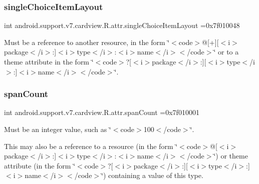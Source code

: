 \subsubsection{\texorpdfstring{single\+Choice\+Item\+Layout}{singleChoiceItemLayout}}
{\footnotesize\ttfamily int android.\+support.\+v7.\+cardview.\+R.\+attr.\+single\+Choice\+Item\+Layout =0x7f010048\hspace{0.3cm}{\ttfamily [static]}}

Must be a reference to another resource, in the form \char`\"{}$<$code$>$@\mbox{[}+\mbox{]}\mbox{[}$<$i$>$package$<$/i$>$\+:\mbox{]}$<$i$>$type$<$/i$>$\+:$<$i$>$name$<$/i$>$$<$/code$>$\char`\"{} or to a theme attribute in the form \char`\"{}$<$code$>$?\mbox{[}$<$i$>$package$<$/i$>$\+:\mbox{]}\mbox{[}$<$i$>$type$<$/i$>$\+:\mbox{]}$<$i$>$name$<$/i$>$$<$/code$>$\char`\"{}. \mbox{\label{classandroid_1_1support_1_1v7_1_1cardview_1_1R_1_1attr_ab82ae971b854d4f764e718ce40d23e44}} 
\subsubsection{\texorpdfstring{span\+Count}{spanCount}}
{\footnotesize\ttfamily int android.\+support.\+v7.\+cardview.\+R.\+attr.\+span\+Count =0x7f010001\hspace{0.3cm}{\ttfamily [static]}}

Must be an integer value, such as \char`\"{}$<$code$>$100$<$/code$>$\char`\"{}. 

This may also be a reference to a resource (in the form \char`\"{}$<$code$>$@\mbox{[}$<$i$>$package$<$/i$>$\+:\mbox{]}$<$i$>$type$<$/i$>$\+:$<$i$>$name$<$/i$>$$<$/code$>$\char`\"{}) or theme attribute (in the form \char`\"{}$<$code$>$?\mbox{[}$<$i$>$package$<$/i$>$\+:\mbox{]}\mbox{[}$<$i$>$type$<$/i$>$\+:\mbox{]}$<$i$>$name$<$/i$>$$<$/code$>$\char`\"{}) containing a value of this type. \mbox{\label{classandroid_1_1support_1_1v7_1_1cardview_1_1R_1_1attr_ae1b00aaf8423d096228a531fca8d1ab2}} 
